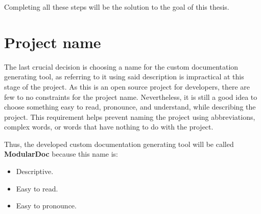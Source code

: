 Completing all these steps will be the solution to the goal of this thesis.

\section{Project name}

The last crucial decision is choosing a name for the custom documentation generating tool, as referring to it using said description is impractical at this stage of the project.
As this is an open source project for developers, there are few to no constraints for the project name.
Nevertheless, it is still a good idea to choose something easy to read, pronounce, and understand, while describing the project.
This requirement helps prevent naming the project using abbreviations, complex words, or words that have nothing to do with the project.

Thus, the developed custom documentation generating tool will be called \textbf{ModularDoc} because this name is:
  \begin{itemize}
    \item Descriptive.
    \item Easy to read.
    \item Easy to pronounce.
  \end{itemize}
